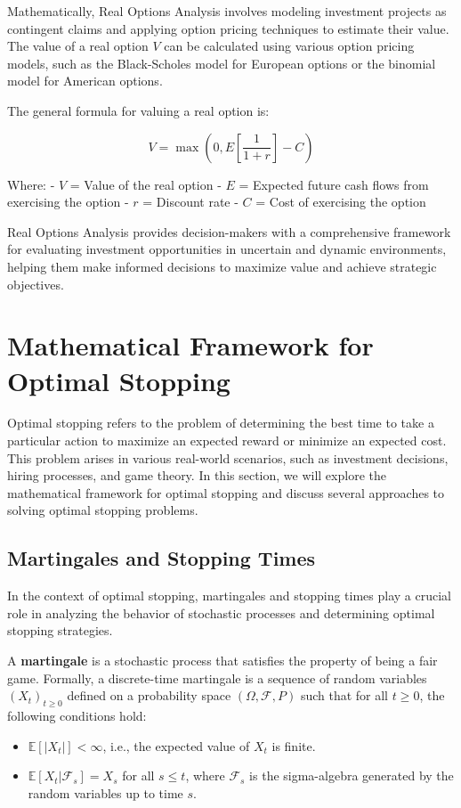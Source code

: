 \documentclass[12pt]{book} %
\begin{document}
Mathematically, Real Options Analysis involves modeling investment projects as contingent claims and applying option pricing techniques to estimate their value. The value of a real option \(V\) can be calculated using various option pricing models, such as the Black-Scholes model for European options or the binomial model for American options.

The general formula for valuing a real option is:

\[ V = \max \left(0, E \left[ \frac{1}{1 + r} \right] - C \right) \]

Where:
- \( V \) = Value of the real option
- \( E \) = Expected future cash flows from exercising the option
- \( r \) = Discount rate
- \( C \) = Cost of exercising the option

Real Options Analysis provides decision-makers with a comprehensive framework for evaluating investment opportunities in uncertain and dynamic environments, helping them make informed decisions to maximize value and achieve strategic objectives.

\section{Mathematical Framework for Optimal Stopping}

Optimal stopping refers to the problem of determining the best time to take a particular action to maximize an expected reward or minimize an expected cost. This problem arises in various real-world scenarios, such as investment decisions, hiring processes, and game theory. In this section, we will explore the mathematical framework for optimal stopping and discuss several approaches to solving optimal stopping problems.

\subsection{Martingales and Stopping Times}

In the context of optimal stopping, martingales and stopping times play a crucial role in analyzing the behavior of stochastic processes and determining optimal stopping strategies.

A \textbf{martingale} is a stochastic process that satisfies the property of being a fair game. Formally, a discrete-time martingale is a sequence of random variables \( (X_t)_{t \geq 0} \) defined on a probability space \( (\Omega, \mathcal{F}, P) \) such that for all \( t \geq 0 \), the following conditions hold:
\begin{itemize}
    \item \( \mathbb{E}[|X_t|] < \infty \), i.e., the expected value of \( X_t \) is finite.
    \item \( \mathbb{E}[X_t | \mathcal{F}_s] = X_s \) for all \( s \leq t \), where \( \mathcal{F}_s \) is the sigma-algebra generated by the random variables up to time \( s \).
\end{itemize}
\end{document}
